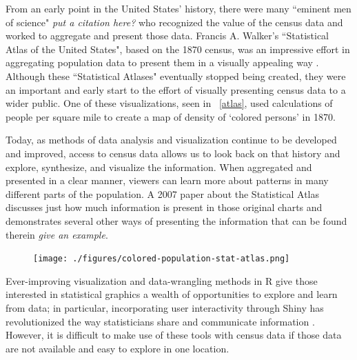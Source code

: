 \documentclass[DIV=calc, paper=a4, fontsize=10pt, twocolumn]{scrartcl}\usepackage[]{graphicx}\usepackage[]{color}
\begin{document}
\par From an early point in the United States' history, there were many ``eminent men of science" \textit{put a citation here?} who recognized the value of the census data and worked to aggregate and present those data. Francis A. Walker's ``Statistical Atlas of the United States", based on the 1870 census, was an impressive effort in aggregating population data to present them in a visually appealing way \citep{StatisticalAtlas}. Although these ``Statistical Atlases" eventually stopped being created, they were an important and early start to the effort of visually presenting census data to a wider public. One of these visualizations, seen in ~\autoref{atlas}, used calculations of people per square mile to create a map of density of `colored persons' in 1870. 


\par Today, as methods of data analysis and visualization continue to be developed and improved, access to census data allows us to look back on that history and explore, synthesize, and visualize the information. When aggregated and presented in a clear manner, viewers can learn more about patterns in many different parts of the population. A 2007 paper about the Statistical Atlas discusses just how much information is present in those original charts and demonstrates several other ways of presenting the information that can be found therein \citep{ChartInterview} \textit{give an example}.  

\begin{figure}[hbtp]
\centering
\texttt{[image: ./figures/colored-population-stat-atlas.png]}  
\label{atlas}
\end{figure}

\par Ever-improving visualization and data-wrangling methods in R \citep{RCoreTeam} give those interested in statistical graphics a wealth of opportunities to explore and learn from data; in particular, incorporating user interactivity through Shiny has revolutionized the way statisticians share and communicate information \citep{Shiny}. However, it is difficult to make use of these tools with census data if those data are not available and easy to explore in one location.  
\end{document}

